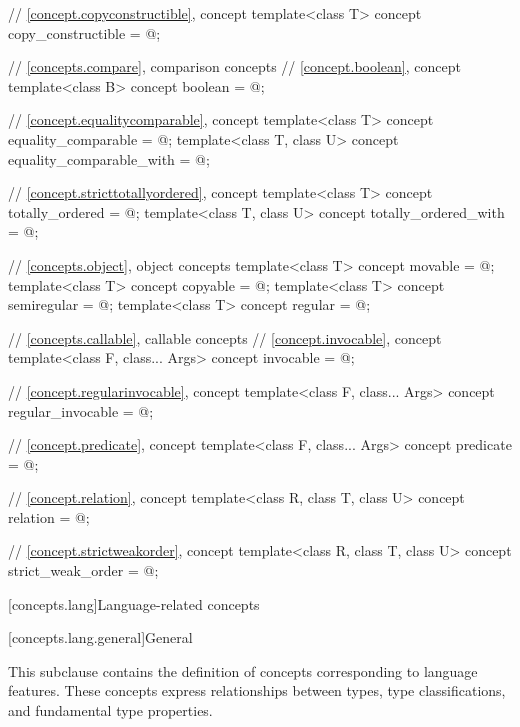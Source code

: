 \begin{codeblock}
{  // \ref{concept.copyconstructible}, concept 
  template<class T>
    concept copy_constructible = @\seebelow@;

  // \ref{concepts.compare}, comparison concepts
  // \ref{concept.boolean}, concept 
  template<class B>
    concept boolean = @\seebelow@;

  // \ref{concept.equalitycomparable}, concept 
  template<class T>
    concept equality_comparable = @\seebelow@;
  template<class T, class U>
    concept equality_comparable_with = @\seebelow@;

  // \ref{concept.stricttotallyordered}, concept 
  template<class T>
    concept totally_ordered = @\seebelow@;
  template<class T, class U>
    concept totally_ordered_with = @\seebelow@;

  // \ref{concepts.object}, object concepts
  template<class T>
    concept movable = @\seebelow@;
  template<class T>
    concept copyable = @\seebelow@;
  template<class T>
    concept semiregular = @\seebelow@;
  template<class T>
    concept regular = @\seebelow@;

  // \ref{concepts.callable}, callable concepts
  // \ref{concept.invocable}, concept 
  template<class F, class... Args>
    concept invocable = @\seebelow@;

  // \ref{concept.regularinvocable}, concept 
  template<class F, class... Args>
    concept regular_invocable = @\seebelow@;

  // \ref{concept.predicate}, concept 
  template<class F, class... Args>
    concept predicate = @\seebelow@;

  // \ref{concept.relation}, concept 
  template<class R, class T, class U>
    concept relation = @\seebelow@;

  // \ref{concept.strictweakorder}, concept 
  template<class R, class T, class U>
    concept strict_weak_order = @\seebelow@;
}
\end{codeblock}

[concepts.lang]{Language-related concepts}

[concepts.lang.general]{General}

\pnum
This subclause contains the definition of concepts corresponding to language
features. These concepts express relationships between types, type
classifications, and fundamental type properties.

